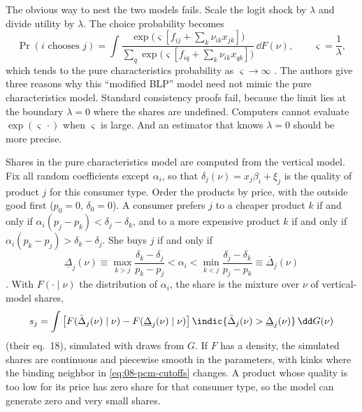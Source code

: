 The obvious way to nest the two models fails. Scale the logit shock by $\lambda$ and divide utility by $\lambda$. The
choice probability becomes
\begin{equation*}
  \Pr(i \text{ chooses } j) = \int \frac{\exp\big(\varsigma[f_{ij} + \sum_k \nu_{ik}x_{jk}]\big)}{\sum_q
  \exp\big(\varsigma[f_{iq} + \sum_k \nu_{ik}x_{qk}]\big)}\,\dd F(\nu), \qquad \varsigma = \frac{1}{\lambda},
\end{equation*}
which tends to the pure characteristics probability as $\varsigma \to \infty$ \citep[eqs.~7--9]{BerryPakes2007}. The
authors give three reasons why this ``modified BLP'' model need not mimic the pure characteristics model. Standard
consistency proofs fail, because the limit lies at the boundary $\lambda = 0$ where the shares are undefined. Computers
cannot evaluate $\exp(\varsigma\, \cdot)$ when $\varsigma$ is large. And an estimator that knows $\lambda = 0$ should be
more precise.

Shares in the pure characteristics model are computed from the vertical model. Fix all random coefficients except
$\alpha_i$, so that $\delta_j(\nu) = x_j\beta_i + \xi_j$ is the quality of product $j$ for this consumer type. Order the
products by price, with the outside good first ($p_0 = 0$, $\delta_0 = 0$). A consumer prefers $j$ to a cheaper product
$k$ if and only if $\alpha_i(p_j - p_k) < \delta_j - \delta_k$, and to a more expensive product $k$ if and only if
$\alpha_i(p_k - p_j) > \delta_k - \delta_j$. She buys $j$ if and only if
\begin{equation}\label{eq:08-pcm-cutoffs}
  \underline{\Delta}_j(\nu) \equiv \max_{k > j}\frac{\delta_k - \delta_j}{p_k - p_j} < \alpha_i <
  \min_{k < j}\frac{\delta_j - \delta_k}{p_j - p_k} \equiv \bar\Delta_j(\nu)
\end{equation}
\citep[eq.~15]{BerryPakes2007}. With $F(\cdot \mid \nu)$ the distribution of $\alpha_i$, the share is the mixture over
$\nu$ of vertical-model shares,
\begin{equation}\label{eq:08-pcm-share}
  s_j = \int \big[F(\bar\Delta_j(\nu) \mid \nu) - F(\underline{\Delta}_j(\nu) \mid \nu)\big]\,
  \indic\{\bar\Delta_j(\nu) > \underline{\Delta}_j(\nu)\}\,\dd G(\nu)
\end{equation}
(their eq.~18), simulated with draws from $G$. If $F$ has a density, the simulated shares are continuous and
piecewise smooth in the parameters, with kinks where the binding neighbor in \eqref{eq:08-pcm-cutoffs} changes. A product whose quality is too low for its price has zero share for that consumer type, so the model can
generate zero and very small shares.

